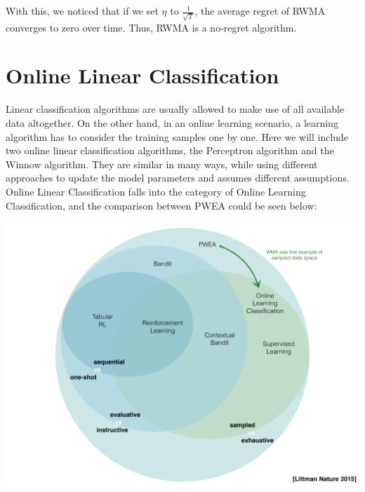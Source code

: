 \documentclass[11pt]{article}
\begin{document}
With this, we noticed that if we set $\eta$ to $\frac{1}{\sqrt{T}}$, the average regret of RWMA converges to zero over time. Thus, RWMA is a no-regret algorithm.


\section{Online Linear Classification}

Linear classification algorithms are usually allowed to make use of all available data altogether. On the other hand, in an online learning scenario, a learning algorithm has to consider the training samples one by one. Here we will include two online linear classification algorithms, the Perceptron algorithm and the Winnow algorithm. They are similar in many ways, while using different approaches to update the model parameters and assumes different assumptions. Online Linear Classification falls into the category of Online Learning Classification, and the comparison between PWEA could be seen below:

\includegraphics[width=\linewidth]{img/diagram.png}

\end{document}
